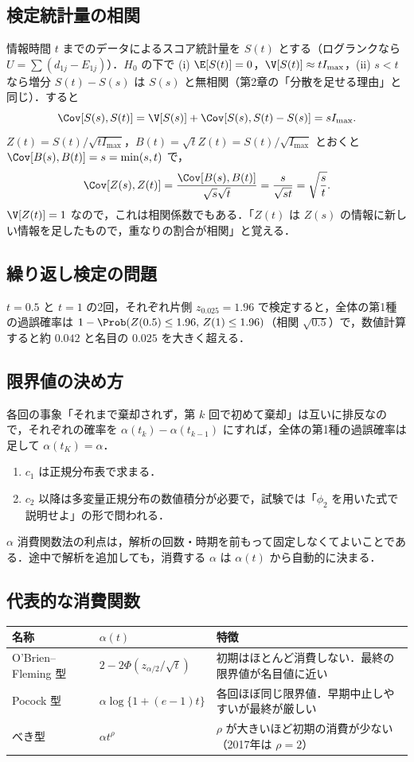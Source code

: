 \subsection{検定統計量の相関}
情報時間 $t$ までのデータによるスコア統計量を $S(t)$ とする（ログランクなら $U=\sum(d_{1j}-E_{1j})$）．$H_0$ の下で
(i) $\E[S(t)]=0$，$\V[S(t)]\approx tI_{\max}$，(ii) $s<t$ なら増分 $S(t)-S(s)$ は $S(s)$ と無相関（第2章の「分散を足せる理由」と同じ）．すると
\[
\Cov[S(s),S(t)]=\V[S(s)]+\Cov[S(s),S(t)-S(s)]=sI_{\max}.
\]
$Z(t)=S(t)/\sqrt{tI_{\max}}$，$B(t)=\sqrt tZ(t)=S(t)/\sqrt{I_{\max}}$ とおくと $\Cov[B(s),B(t)]=s=\min(s,t)$ で，
\[
\Cov[Z(s),Z(t)]=\frac{\Cov[B(s),B(t)]}{\sqrt s\sqrt t}=\frac{s}{\sqrt{st}}=\sqrt{\frac st}.
\]
$\V[Z(t)]=1$ なので，これは相関係数でもある．「$Z(t)$ は $Z(s)$ の情報に新しい情報を足したもので，重なりの割合が相関」と覚える．

\subsection{繰り返し検定の問題}
$t=0.5$ と $t=1$ の2回，それぞれ片側 $z_{0.025}=1.96$ で検定すると，全体の第1種の過誤確率は $1-\Prob(Z(0.5)\le1.96,\,Z(1)\le1.96)$（相関 $\sqrt{0.5}$）で，数値計算すると約 $0.042$ と名目の $0.025$ を大きく超える．

\subsection{限界値の決め方}
各回の事象「それまで棄却されず，第 $k$ 回で初めて棄却」は互いに排反なので，それぞれの確率を $\alpha(t_k)-\alpha(t_{k-1})$ にすれば，全体の第1種の過誤確率は足して $\alpha(t_K)=\alpha$．
\begin{enumerate}
\item $c_1$ は正規分布表で求まる．
\item $c_2$ 以降は多変量正規分布の数値積分が必要で，試験では「$\phi_2$ を用いた式で説明せよ」の形で問われる．
\end{enumerate}
$\alpha$ 消費関数法の利点は，解析の回数・時期を前もって固定しなくてよいことである．途中で解析を追加しても，消費する $\alpha$ は $\alpha(t)$ から自動的に決まる．

\subsection{代表的な消費関数}
\begin{center}\small
\begin{tabular}{@{}llL{70mm}@{}}
\toprule
名称 & $\alpha(t)$ & 特徴\\
\midrule
O'Brien--Fleming 型 & $2-2\Phi(z_{\alpha/2}/\sqrt t)$ & 初期はほとんど消費しない．最終の限界値が名目値に近い\\
Pocock 型 & $\alpha\log\{1+(e-1)t\}$ & 各回ほぼ同じ限界値．早期中止しやすいが最終が厳しい\\
べき型 & $\alpha t^\rho$ & $\rho$ が大きいほど初期の消費が少ない（2017年は $\rho=2$）\\
\bottomrule
\end{tabular}
\end{center}

